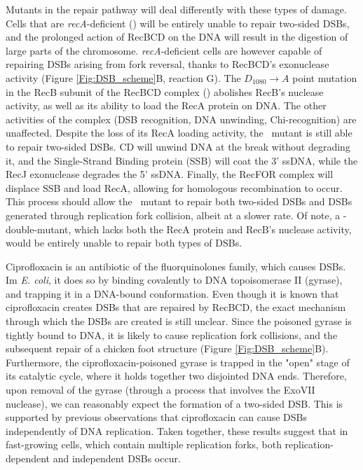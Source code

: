 Mutants in the repair pathway will deal differently with these types of damage. Cells that are \emph{recA}-deficient (\dreca) will be entirely unable to repair two-sided DSBs, and the prolonged action of RecBCD on the DNA will result in the digestion of large parts of the chromosome\cite{Horii1968, Chow2007}. \emph{recA}-deficient cells are however capable of repairing DSBs arising from fork reversal, thanks to RecBCD's exonuclease activity (Figure \ref{Fig:DSB_scheme}B, reaction G)\cite{Seigneur1998, Michel2001}. The $D_{1080} \rightarrow A$ point mutation in the RecB subunit of the RecBCD complex (\teneighty) abolishes RecB's nuclease activity, as well as its ability to load the RecA protein on DNA\cite{Yu1998, Wang2000}. The other activities of the complex (DSB recognition, DNA unwinding, Chi-recognition) are unaffected\cite{Anderson1999}. Despite the loss of its RecA loading activity, the \teneighty\ mutant is still able to repair two-sided DSBs. \teneighty CD will unwind DNA at the break without degrading it, and the Single-Strand Binding protein (SSB) will coat the 3' ssDNA, while the RecJ exonuclease degrades the 5' ssDNA. Finally, the RecFOR complex will displace SSB and load RecA, allowing for homologous recombination to occur\cite{Ivancic-Bace_2003}. This process should allow the \teneighty\ mutant to repair both two-sided DSBs and DSBs generated through replication fork collision, albeit at a slower rate. Of note, a \dreca-\teneighty double-mutant, which lacks both the RecA protein and RecB's nuclease activity, would be entirely unable to repair both types of DSBs.

Ciprofloxacin is an antibiotic of the fluor\-quinolones family, which causes DSBs. Im \emph{E. coli}, it does so by binding covalently to DNA topoisomerase II (gyrase), and trapping it in a DNA-bound conformation\cite{Kohanski2010}. Even though it is known that ciprofloxacin creates DSBs that are repaired by RecBCD, the exact mechanism through which the DSBs are created is still unclear. Since the poisoned gyrase is tightly bound to DNA, it is likely to cause replication fork collisions\cite{Wentzell2000, Drlica2008}, and the subsequent repair of a chicken foot structure (Figure \ref{Fig:DSB_scheme}B). Furthermore, the ciprofloxacin-poisoned gyrase is trapped in the "open" stage of its catalytic cycle, where it holds together two disjointed DNA ends. Therefore, upon removal of the gyrase (through a process that involves the ExoVII nuclease\cite{Huang2021}), we can reasonably expect the formation of a two-sided DSB. This is supported by previous observations that ciprofloxacin can cause DSBs independently of DNA replication\cite{Zhao2006}. Taken together, these results suggest that in fast-growing cells, which contain multiple replication forks, both replication-dependent and independent DSBs occur.

